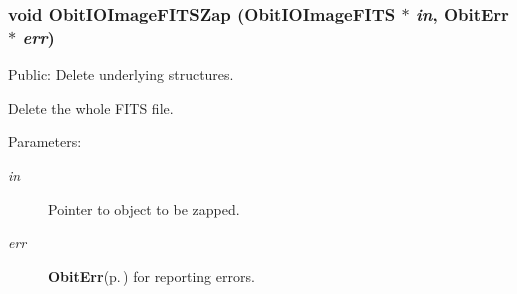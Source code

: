 \subsubsection{\setlength{\rightskip}{0pt plus 5cm}void Obit\-IOImage\-FITSZap ({\bf Obit\-IOImage\-FITS} $\ast$ {\em in}, {\bf Obit\-Err} $\ast$ {\em err})}\label{ObitIOImageFITS_8h_a8}


Public: Delete underlying structures. 

Delete the whole FITS file. \begin{Desc}
\item[Parameters:]
\begin{description}
\item[{\em in}]Pointer to object to be zapped. \item[{\em err}]{\bf Obit\-Err}{\rm (p.\,\pageref{structObitErr})} for reporting errors. \end{description}
\end{Desc}
